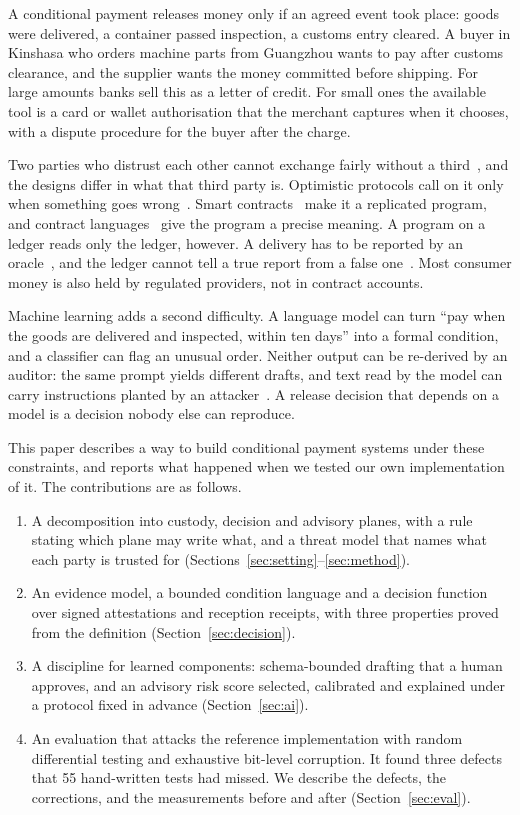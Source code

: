 \documentclass[10pt,a4paper]{article}
\theoremstyle{tight}
\begin{document}
A conditional payment releases money only if an agreed event took place: goods were delivered, a container passed
inspection, a customs entry cleared. A buyer in Kinshasa who orders machine parts from Guangzhou wants to pay after
customs clearance, and the supplier wants the money committed before shipping. For large amounts banks sell this as
a letter of credit. For small ones the available tool is a card or wallet authorisation that the merchant captures
when it chooses, with a dispute procedure for the buyer after the charge.

Two parties who distrust each other cannot exchange fairly without a third~\cite{pagnia1999}, and the designs differ
in what that third party is. Optimistic protocols call on it only when something goes
wrong~\cite{asokan2000}. Smart contracts~\cite{szabo1997} make it a replicated program, and contract
languages~\cite{peytonjones2000,bartoletti2018,lamela2018} give the program a precise meaning. A program on a ledger
reads only the ledger, however. A delivery has to be reported by an oracle~\cite{zhang2016,zhang2020}, and the ledger
cannot tell a true report from a false one~\cite{caldarelli2020,eskandari2021}. Most consumer money is also held by
regulated providers, not in contract accounts.

Machine learning adds a second difficulty. A language model can turn ``pay when the goods are delivered and
inspected, within ten days'' into a formal condition, and a classifier can flag an unusual order. Neither output
can be re-derived by an auditor: the same prompt yields different drafts, and text read by the model can carry
instructions planted by an attacker~\cite{greshake2023}. A release decision that depends on a model is a decision
nobody else can reproduce.

This paper describes a way to build conditional payment systems under these constraints, and reports what happened
when we tested our own implementation of it. The contributions are as follows.
\begin{enumerate}
\item A decomposition into custody, decision and advisory planes, with a rule stating which plane may write what,
and a threat model that names what each party is trusted for (Sections~\ref{sec:setting}--\ref{sec:method}).
\item An evidence model, a bounded condition language and a decision function over signed attestations and
reception receipts, with three properties proved from the definition (Section~\ref{sec:decision}).
\item A discipline for learned components: schema-bounded drafting that a human approves, and an advisory risk
score selected, calibrated and explained under a protocol fixed in advance (Section~\ref{sec:ai}).
\item An evaluation that attacks the reference implementation with random differential testing and exhaustive
bit-level corruption. It found three defects that 55 hand-written tests had missed. We describe the defects, the
corrections, and the measurements before and after (Section~\ref{sec:eval}).
\end{enumerate}
\end{document}
